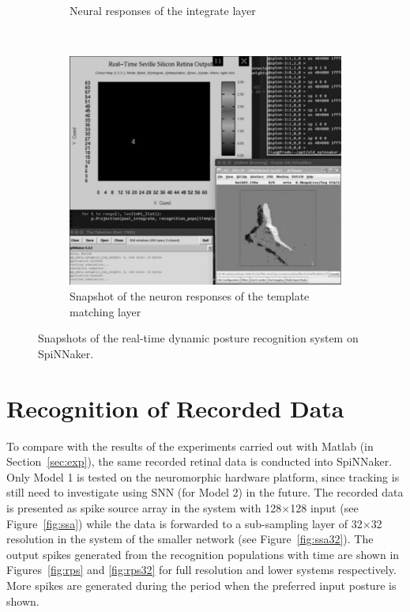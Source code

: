 \begin{figure}
\begin{subfigure}[t]{0.4\textwidth}
		\caption{Neural responses of the integrate layer~\cite{video2}}
	    \label{fig:live2}
	\end{subfigure}
	\\
	\begin{subfigure}[t]{0.8\textwidth}
		\includegraphics[width=\textwidth]{pics/live.png}
		\caption{Snapshot of the neuron responses of the template matching layer~\cite{video3}}
	    \label{fig:live3}
	\end{subfigure}	

\caption{Snapshots of the real-time dynamic posture recognition system on SpiNNaker.
}
\label{fig:live}
\end{figure}

\section{Recognition of Recorded Data}
To compare with the results of the experiments carried out with Matlab (in Section~\ref{sec:exp}), the same recorded retinal data is conducted into SpiNNaker.
Only Model 1 is tested on the neuromorphic hardware platform, since tracking is still need to investigate using SNN (for Model 2) in the future. 
The recorded data is presented as spike source array in the system with 128$\times$128 input (see Figure~\ref{fig:ssa}) while the data is forwarded to a sub-sampling layer of 32$\times$32 resolution in the system of the smaller network (see Figure~\ref{fig:ssa32}). 
The output spikes generated from the recognition populations with time are shown in Figures~\ref{fig:rps} and \ref{fig:rps32} for full resolution and lower systems respectively. 
More spikes are generated during the period when the preferred input posture is shown. 


